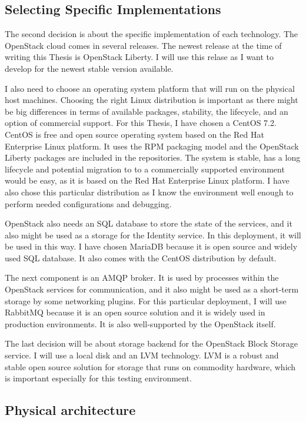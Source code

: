 \subsection{Selecting Specific Implementations}
The second decision is about the specific implementation of each technology. The OpenStack cloud comes in several releases. The newest release at the time of writing this Thesis is OpenStack Liberty. I will use this relase as I want to develop for the newest stable version available.


I also need to choose an operating system platform that will run on the physical host machines. Choosing the right Linux distribution is important as there might be big differences in terms of available packages, stability, the lifecycle, and an option of commercial support. For this Thesis, I have chosen a CentOS 7.2. CentOS is free and open source operating system based on the Red Hat Enterprise Linux platform. It uses the RPM packaging model and the OpenStack Liberty packages are included in the repositories. The system is stable, has a long lifecycle and potential migration to to a commercially supported environment would be easy, as it is based on the Red Hat Enterprise Linux platform. I have also chose this particular distribution as I know the environment well enough to perform needed configurations and debugging.

OpenStack also needs an SQL database to store the state of the services, and it also might be used as a storage for the Identity service. In this deployment, it will be used in this way. I have chosen MariaDB because it is open source and widely used SQL database. It also comes with the CentOS distribution by default.

The next component is an AMQP broker. It is used by processes within the OpenStack services for communication, and it also might be used as a short-term storage by some networking plugins. For this particular deployment, I will use RabbitMQ because it is an open source solution and it is widely used in production environments. It is also well-supported by the OpenStack itself.

The last decision will be about storage backend for the OpenStack Block Storage service. I will use a local disk and an LVM technology. LVM is a robust and stable open source solution for storage that runs on commodity hardware, which is important especially for this testing environment.


\subsection{Physical architecture}

